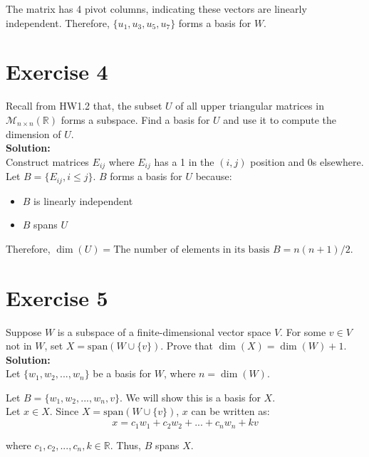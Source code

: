 \documentclass{article}
\begin{document}
The matrix has 4 pivot columns, indicating these vectors are linearly independent. Therefore, $\{u_1, u_3, u_5, u_7\}$ forms a basis for $W$.

\newpage

\section*{Exercise 4}
Recall from HW1.2 that, the subset $U$ of all upper triangular matrices in $\mathcal{M}_{n\times n}(\mathbb{R})$ forms a subspace. Find a basis for $U$ and use it to compute the dimension of $U$. \\

\textbf{Solution:} \\

Construct matrices $E_{ij}$ where $E_{ij}$ has a 1 in the $(i,j)$ position and 0s elsewhere. \\

Let $B = \{E_{ij}, i \leq j\}$. $B$ forms a basis for $U$ because:
\begin{itemize}
\item $B$ is linearly independent
\item $B$ spans $U$
\end{itemize}

Therefore, $\dim(U) = \text{The number of elements in its basis } B = n(n+1)/2$.

\newpage

\section*{Exercise 5}
Suppose $W$ is a subspace of a finite-dimensional vector space $V$. For some $v \in V$ not in $W$, set $X = \text{span}(W \cup \{v\})$. Prove that $\dim(X) = \dim(W) + 1$. \\

\textbf{Solution:} \\

Let $\{w_1, w_2, ..., w_n\}$ be a basis for $W$, where $n = \dim(W)$.

Let $B = \{w_1, w_2, ..., w_n, v\}$. We will show this is a basis for $X$. \\

Let $x \in X$. Since $X = \text{span}(W \cup \{v\})$, $x$ can be written as:
\[x = c_1w_1 + c_2w_2 + ... + c_nw_n + kv\]

where $c_1, c_2, ..., c_n, k \in \mathbb{R}$. Thus, $B$ spans $X$. \\
\end{document}
